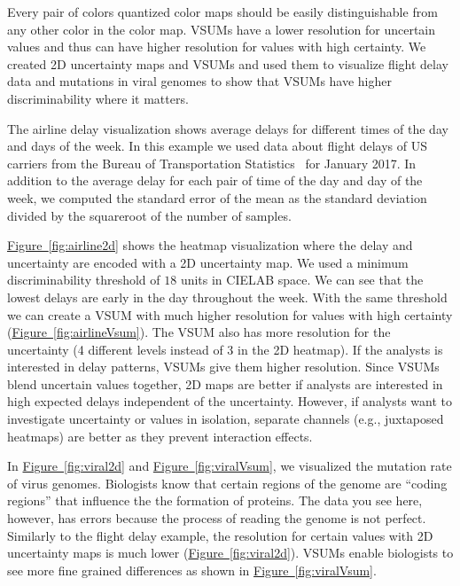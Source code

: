 \documentclass{vgtc}                          %
\newcommand{\figref}[1]{\hyperref[#1]{Figure~\ref*{#1}}}
\newcommand{\eg}{{e.g.,}\xspace}
\begin{document}
Every pair of colors quantized color maps should be easily distinguishable from any other color in the color map. VSUMs have a lower resolution for uncertain values and thus can have higher resolution for values with high certainty. We created 2D uncertainty maps and VSUMs and used them to visualize flight delay data and mutations in viral genomes to show that VSUMs have higher discriminability where it matters.

The airline delay visualization shows average delays for different times of the day and days of the week. In this example we used data about flight delays of US carriers from the Bureau of Transportation Statistics~\cite{bts} for January 2017. In addition to the average delay for each pair of time of the day and day of the week, we computed the standard error of the mean as the standard deviation divided by the squareroot of the number of samples.

\airlineFig

\figref{fig:airline2d} shows the heatmap visualization where the delay and uncertainty are encoded with a 2D uncertainty map. We used a minimum discriminability  threshold of $18$ units in CIELAB space. We can see that the lowest delays are early in the day throughout the week. With the same threshold we can create a VSUM with much higher resolution for values with high certainty (\figref{fig:airlineVsum}). The VSUM also has more resolution for the uncertainty (4 different levels instead of 3 in the 2D heatmap). If the analysts is interested in delay patterns, VSUMs give them higher resolution. Since VSUMs blend uncertain values together, 2D maps are better if analysts are interested in high expected delays independent of the uncertainty. However, if analysts want to investigate uncertainty or values in isolation, separate channels (\eg juxtaposed heatmaps) are better as they prevent interaction effects. 

\viralFig

In \figref{fig:viral2d} and \figref{fig:viralVsum}, we visualized the mutation rate of virus genomes. Biologists know that certain regions of the genome are ``coding regions'' that influence the the formation of proteins. The data you see here, however, has errors because the process of reading the genome is not perfect. Similarly to the flight delay example, the resolution for certain values with 2D uncertainty maps is much lower (\figref{fig:viral2d}). VSUMs enable biologists to see more fine grained differences as shown in \figref{fig:viralVsum}.
\end{document}
